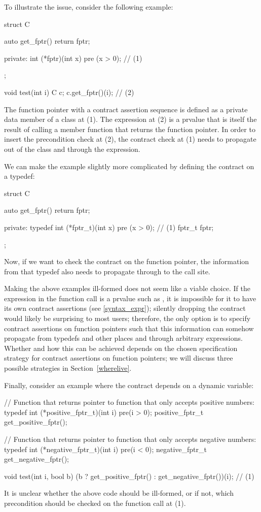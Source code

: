 To illustrate the issue, consider the following example:
\begin{codeblock}
struct C {
  auto get_fptr() { return fptr; }
  
private:
  int (*fptr)(int x) pre (x > 0);  // (1)
};

void test(int i) {
  C c;
  c.get_fptr()(i);  // (2)
}
\end{codeblock}
The function pointer with a contract assertion sequence is defined as a private data member of a class at (1). The expression at (2) is a prvalue that is itself the result of calling a member function that returns the function pointer. In order to insert the precondition check at (2), the contract check at (1) needs to propagate out of the class and through the expression.

We can make the example slightly more complicated by defining the contract on a typedef:
\begin{codeblock}
struct C {
  auto get_fptr() { return fptr; }
  
private:
  typedef int (*fptr_t)(int x) pre (x > 0);  // (1)
  fptr_t fptr;
};
\end{codeblock}
Now, if  we want to check the contract on the function pointer, the information from that typedef also needs to propagate through to the call site.

Making the above examples ill-formed does not seem like a viable choice. If the expression in the function call is a prvalue such as , it is impossible for it to have its own contract assertions (see \ref{syntax_expr}); silently dropping the contract would likely be surprising to most users; therefore, the only option is to specify contract assertions on function pointers such that this information can somehow propagate from typedefs and other places and through arbitrary expressions. Whether and how this can be achieved depends on the chosen specification strategy for contract assertions on function pointers; we will discuss three possible strategies in Section~\ref{wherelive}.

Finally, consider an example where the contract depends on a dynamic variable:
\begin{codeblock}
// Function that returns pointer to function that only accepts positive numbers:
typedef int (*positive_fptr_t)(int i) pre(i > 0);
positive_fptr_t get_positive_fptr();

// Function that returns pointer to function that only accepts negative numbers:
typedef int (*negative_fptr_t)(int i) pre(i < 0);
negative_fptr_t get_negative_fptr();

void test(int i, bool b) {
  (b ? get_positive_fptr() : get_negative_fptr())(i);  // (1)
}
\end{codeblock}
It is unclear whether the above code should be ill-formed, or if not, which precondition should be checked on the function call at (1).

